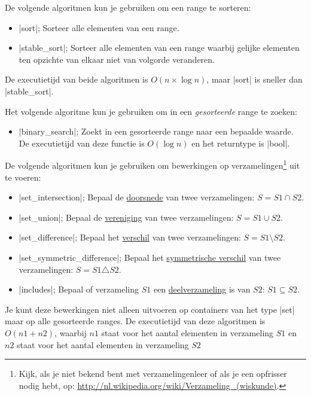 \begin{cpplstShortInline}
De volgende algoritmen kun je gebruiken om een range te sorteren:
\begin{itemize}
	\item |sort|; Sorteer alle elementen van een range.
	\item |stable_sort|; Sorteer alle elementen van een range waarbij gelijke elementen ten opzichte van elkaar niet van volgorde veranderen.
\end{itemize}
De executietijd van beide algoritmen is $O(n\times{}\log{n})$, maar |sort| is sneller dan |stable_sort|.

Het volgende algoritme kun je gebruiken om in een \emph{gesorteerde} range te zoeken:
\begin{itemize}
	\item |binary_search|; Zoekt in een gesorteerde range naar een bepaalde waarde.
	De executietijd van deze functie is $O(\log{n})$ en het returntype is |bool|.
\end{itemize}

De volgende algoritmen kun je gebruiken om bewerkingen op verzamelingen\footnote{%
	Kijk, als je niet bekend bent met verzamelingenleer of als je een opfrisser nodig hebt, op: \url{http://nl.wikipedia.org/wiki/Verzameling_(wiskunde)}.
} uit te voeren:
\begin{itemize}
	\item |set_intersection|; Bepaal de \href{http://nl.wikipedia.org/wiki/Doorsnede_(verzamelingenleer)}{doorsnede} van twee verzamelingen: $S = S1 \cap S2$.
	\item |set_union|; Bepaal de \href{http://nl.wikipedia.org/wiki/Vereniging_(verzamelingenleer)}{vereniging} van twee verzamelingen: $S = S1 \cup S2$.
	\item |set_difference|; Bepaal het \href{http://nl.wikipedia.org/wiki/Verschil_(verzamelingenleer)}{verschil} van twee verzamelingen: $S = S1 \setminus S2$.
	\item |set_symmetric_difference|; Bepaal het \href{http://nl.wikipedia.org/wiki/Symmetrisch_verschil}{symmetrische verschil} van twee verzamelingen: $S = S1 \triangle S2$.
	\item |includes|; Bepaal of verzameling $S1$ een \href{http://nl.wikipedia.org/wiki/Deelverzameling}{deelverzameling} is van $S2$: $S1 \subseteq S2$.
\end{itemize}
Je kunt deze bewerkingen niet alleen uitvoeren op containers van het type |set| maar op alle gesorteerde ranges.
De executietijd van deze algoritmen is $O(n1+n2)$, waarbij $n1$ staat voor het aantal elementen in verzameling $S1$ en $n2$ staat voor het aantal elementen in verzameling $S2$


\end{cpplstShortInline}
